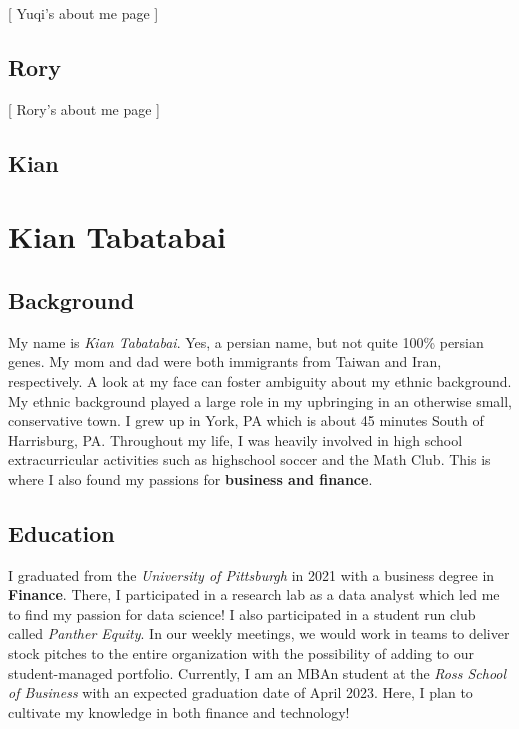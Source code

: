 \documentclass[
]{book}
\begin{document}
{[} Yuqi's about me page {]}

\hypertarget{rory}{%
\section{Rory}\label{rory}}

{[} Rory's about me page {]}

\hypertarget{kian}{%
\section{Kian}\label{kian}}

\hypertarget{kian-tabatabai}{%
\chapter{Kian Tabatabai}\label{kian-tabatabai}}

\hypertarget{background}{%
\section{Background}\label{background}}

My name is \emph{Kian Tabatabai}. Yes, a persian name, but not quite 100\% persian genes. My mom and dad were both immigrants from Taiwan and Iran, respectively. A look at my face can foster ambiguity about my ethnic background. My ethnic background played a large role in my upbringing in an otherwise small, conservative town. I grew up in York, PA which is about 45 minutes South of Harrisburg, PA. Throughout my life, I was heavily involved in high school extracurricular activities such as highschool soccer and the Math Club. This is where I also found my passions for \textbf{business and finance}.

\hypertarget{education}{%
\section{Education}\label{education}}

I graduated from the \emph{University of Pittsburgh} in 2021 with a business degree in \textbf{Finance}. There, I participated in a research lab as a data analyst which led me to find my passion for data science! I also participated in a student run club called \emph{Panther Equity}. In our weekly meetings, we would work in teams to deliver stock pitches to the entire organization with the possibility of adding to our student-managed portfolio. Currently, I am an MBAn student at the \emph{Ross School of Business} with an expected graduation date of April 2023. Here, I plan to cultivate my knowledge in both finance and technology!
\end{document}
